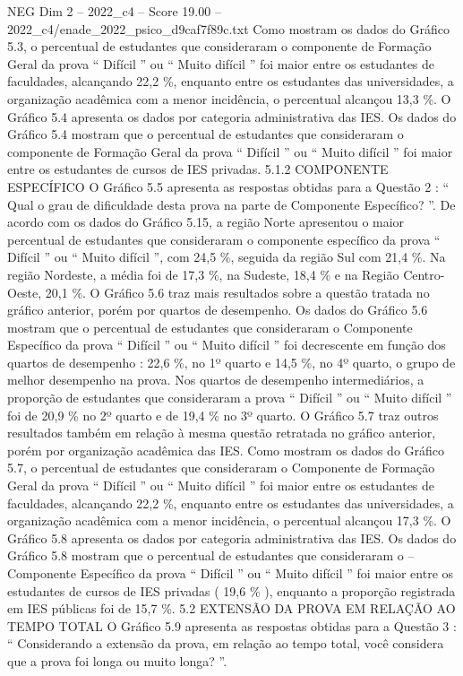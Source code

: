 \begin{textsample}{NEG Dim 2 – 2022\_c4 – Score 19.00 – 2022\_c4/enade\_2022\_psico\_d9caf7f89c.txt}
Como mostram os dados do Gráfico 5.3, o percentual de estudantes que consideraram o componente de Formação Geral da prova “ Difícil ” ou “ Muito difícil ” foi maior entre os estudantes de faculdades, alcançando 22,2 \%, enquanto entre os estudantes das universidades, a organização acadêmica com a menor incidência, o percentual alcançou 13,3 \%.
O Gráfico 5.4 apresenta os dados por categoria administrativa das IES.
Os dados do Gráfico 5.4 mostram que o percentual de estudantes que consideraram o componente de Formação Geral da prova “ Difícil ” ou “ Muito difícil ” foi maior entre os estudantes de cursos de IES privadas. 5.1.2 COMPONENTE ESPECÍFICO O Gráfico 5.5 apresenta as respostas obtidas para a Questão 2 : “ Qual o grau de dificuldade desta prova na parte de Componente Específico? ”.
De acordo com os dados do Gráfico 5.15, a região Norte apresentou o maior percentual de estudantes que consideraram o componente específico da prova “ Difícil ” ou “ Muito difícil ”, com 24,5 \%, seguida da região Sul com 21,4 \%.
Na região Nordeste, a média foi de 17,3 \%, na Sudeste, 18,4 \% e na Região Centro-Oeste, 20,1 \%.
O Gráfico 5.6 traz mais resultados sobre a questão tratada no gráfico anterior, porém por quartos de desempenho.
Os dados do Gráfico 5.6 mostram que o percentual de estudantes que consideraram o Componente Específico da prova “ Difícil ” ou “ Muito difícil ” foi decrescente em função dos quartos de desempenho : 22,6 \%, no 1º quarto e 14,5 \%, no 4º quarto, o grupo de melhor desempenho na prova.
Nos quartos de desempenho intermediários, a proporção de estudantes que consideraram a prova “ Difícil ” ou “ Muito difícil ” foi de 20,9 \% no 2º quarto e de 19,4 \% no 3º quarto.
O Gráfico 5.7 traz outros resultados também em relação à mesma questão retratada no gráfico anterior, porém por organização acadêmica das IES.
Como mostram os dados do Gráfico 5.7, o percentual de estudantes que consideraram o Componente de Formação Geral da prova “ Difícil ” ou “ Muito difícil ” foi maior entre os estudantes de faculdades, alcançando 22,2 \%, enquanto entre os estudantes das universidades, a organização acadêmica com a menor incidência, o percentual alcançou 17,3 \%.
O Gráfico 5.8 apresenta os dados por categoria administrativa das IES.
Os dados do Gráfico 5.8 mostram que o percentual de estudantes que consideraram o – Componente Específico da prova “ Difícil ” ou “ Muito difícil ” foi maior entre os estudantes de cursos de IES privadas ( 19,6 \% ), enquanto a proporção registrada em IES públicas foi de 15,7 \%. 5.2 EXTENSÃO DA PROVA EM RELAÇÃO AO TEMPO TOTAL O Gráfico 5.9 apresenta as respostas obtidas para a Questão 3 : “ Considerando a extensão da prova, em relação ao tempo total, você considera que a prova foi longa ou muito longa? ”.

\end{textsample}
